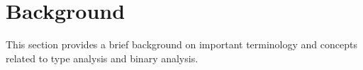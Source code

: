 
\section{Background}

This section provides a brief background on important terminology and concepts related to type analysis and binary analysis.





%
%
